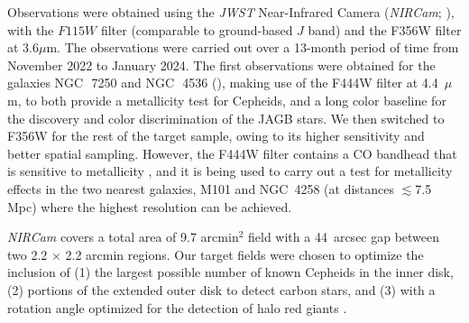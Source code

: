 \documentclass[12pt,modern]{aastex631}
\newcommand{\jwst}{\emph{JWST}\xspace}
\newcommand{\nircam}{\emph{NIRCam}\xspace}
\newcommand{\ngc}{NGC\,\xspace}
\begin{document}
Observations were obtained using the \jwst Near-Infrared Camera (\nircam; \cite{rieke_2023}), with the  $F115W$ filter (comparable to ground-based $J$ band) and the F356W filter at 3.6$\mu$m. The observations were carried out  over a 13-month period of time from  November 2022 to January 2024. The  first observations were obtained for the galaxies \ngc~7250 and \ngc~4536  (\cite{lee_2024a, freedman_madore_2023a, freedman_madore_2023b, hoyt_2025a, owens_2025a}),  making use of the F444W filter at 4.4~$\mu$m, to both provide a metallicity test for Cepheids, and a long color baseline for the discovery and color discrimination of the JAGB stars. We then switched to F356W for the rest of the target sample, owing to its higher sensitivity and better spatial sampling. However, the F444W filter contains a CO bandhead that is sensitive to metallicity \citep{scowcroft_2016b}, and it is being used to carry out a test for metallicity effects in the two nearest galaxies, M101 and \ngc 4258 (at distances $\lesssim$7.5 Mpc) where the highest resolution can be achieved.

\nircam covers a total  area of 9.7 arcmin$^2$ field with a 44~arcsec gap between two 2.2 × 2.2 arcmin regions. Our target fields were chosen to optimize the inclusion of (1) the largest possible number of known Cepheids in the inner disk, (2)  portions of the extended outer disk to detect carbon stars, and (3) with a rotation angle optimized for the detection of halo red giants \citep{hoyt_2025a}. 
\end{document}
